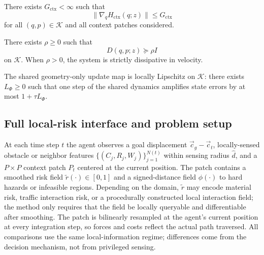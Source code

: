 \begin{assumption}
\label{ass:bounded_ctx}
There exists \(G_{\mathrm{ctx}}<\infty\) such that
\[
    \|\nabla_q H_{\mathrm{ctx}}(q;z)\|\le G_{\mathrm{ctx}}
\]
for all \((q,p)\in\mathcal K\) and all context patches considered.
\end{assumption}

\begin{assumption}
\label{ass:diss}
There exists \(\rho\ge 0\) such that
\[
    D(q,p;z)\succeq \rho I
\]
on \(\mathcal K\). When \(\rho>0\), the system is strictly dissipative in velocity.
\end{assumption}

\begin{assumption}
\label{ass:lipschitz_rollout}
The shared geometry-only update map is locally Lipschitz on \(\mathcal K\): there exists
\(L_\Phi\ge 0\) such that one step of the shared dynamics amplifies state errors by at
most \(1+\tau L_\Phi\).
\end{assumption}


\subsection{Full local-risk interface and problem setup}
\label{app:setup_full}

At each time step $t$ the agent observes a goal displacement
$\vec c_g-\vec c_t$, locally-sensed obstacle or neighbor features
$\{(C_j,R_j,W_j)\}_{j=1}^{N(t)}$ within sensing radius $\hat d$, and a
$P\times P$ context patch $P_t$ centered at the current position.
The patch contains a smoothed risk field $\tilde r(\cdot)\in[0,1]$ and a
signed-distance field $\phi(\cdot)$ to hard hazards or infeasible regions.
Depending on the domain, $\tilde r$ may encode material risk, traffic
interaction risk, or a procedurally constructed local interaction field;
the method only requires that the field be locally queryable and
differentiable after smoothing.
The patch is bilinearly resampled at the agent's current position at
every integration step, so forces and costs reflect the actual path
traversed.
All comparisons use the same local-information regime; differences come
from the decision mechanism, not from privileged sensing.


